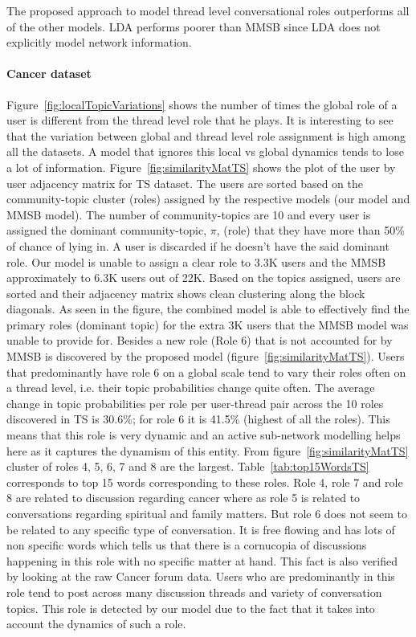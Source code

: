 \documentclass{sig-alternate}
\begin{document}
The proposed approach to model thread level conversational roles outperforms
all of the other models. LDA performs poorer than MMSB since LDA does not 
explicitly model network information. 
\paragraph{Cancer dataset}



Figure~\ref{fig:localTopicVariations} shows the number of times the global role
of a user is different from the thread level role that he plays. It is 
interesting to see that the variation between global and thread level role
assignment is high among all the datasets. A model that ignores this local vs
global dynamics tends to lose a lot of information.
Figure~\ref{fig:similarityMatTS} shows the plot of the user by user adjacency 
matrix for TS dataset. The users are sorted based on the community-topic cluster
(roles) assigned by the respective models (our model and MMSB model). The number of
community-topics are 10 and every user is assigned the dominant
community-topic, $\pi$, (role) that they have more than 50\% of chance of lying in. A user 
is discarded if he
doesn't have the said dominant role. Our model is unable to assign a clear 
role to 3.3K users and
the MMSB approximately to 6.3K users out of 22K. Based on the topics assigned,
users are sorted and their adjacency matrix shows clean clustering along the
block diagonals.
As seen in the figure, the combined model is able to effectively find the
primary roles (dominant topic) for the extra 3K users that the MMSB model was
unable to provide for. Besides a new role (Role 6) that is not accounted for by
MMSB is discovered by the proposed model (figure~\ref{fig:similarityMatTS}).
Users that predominantly have role 6 on a global scale tend to vary their roles
often on a thread level, i.e. their topic probabilities change quite often. The
average change in topic probabilities per role per user-thread pair across the
10 roles discovered in TS is 30.6\%; for role 6 it is 41.5\% (highest of all the roles). 
This means
that this role is very dynamic and an active sub-network modelling helps here as 
it captures the
dynamism of this entity. From figure~\ref{fig:similarityMatTS} cluster of roles
4, 5, 6, 7 and 8 are the largest. Table~\ref{tab:top15WordsTS} corresponds to
top 15 words corresponding to these roles. Role 4, role 7 and role 8 are
related to discussion regarding cancer where as role 5 is related to
conversations regarding spiritual and family matters.  But role 6 does not seem
to be related to any specific type of conversation. It is free flowing and has
lots of non specific words which tells us that there is a cornucopia of
discussions happening in this role with no specific matter at hand. This fact
is also verified by looking at the raw Cancer forum data. Users who are
predominantly in this role tend to post across many discussion threads and
variety of conversation topics. This role is detected by our model due to the
fact that it takes into account the dynamics of such a role.
\end{document}
